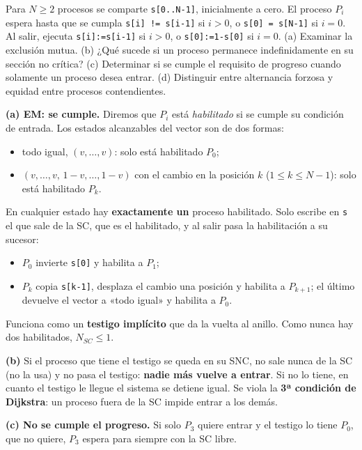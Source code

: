 \begin{ejercicio}
Para $N \ge 2$ procesos se comparte \texttt{s[0..N-1]}, inicialmente a cero. El proceso $P_i$ espera hasta que se
cumpla \texttt{s[i] != s[i-1]} si $i > 0$, o \texttt{s[0] = s[N-1]} si $i = 0$. Al salir, ejecuta
\texttt{s[i]:=s[i-1]} si $i > 0$, o \texttt{s[0]:=1-s[0]} si $i = 0$. (a) Examinar la exclusión mutua. (b) ¿Qué
sucede si un proceso permanece indefinidamente en su sección no crítica? (c) Determinar si se cumple el
requisito de progreso cuando solamente un proceso desea entrar. (d) Distinguir entre alternancia forzosa y
equidad entre procesos contendientes.
\end{ejercicio}
\begin{solucion}
\textbf{(a) EM: se cumple.} Diremos que $P_i$ está \emph{habilitado} si se cumple su condición de entrada. Los
estados alcanzables del vector son de dos formas:
\begin{itemize}[leftmargin=*,noitemsep]
  \item todo igual, $(v,\dots,v)$: solo está habilitado $P_0$;
  \item $(v,\dots,v,\,1-v,\dots,1-v)$ con el cambio en la posición $k$ ($1 \le k \le N-1$): solo está habilitado
        $P_k$.
\end{itemize}
En cualquier estado hay \textbf{exactamente un} proceso habilitado. Solo escribe en \texttt{s} el que sale de la
SC, que es el habilitado, y al salir pasa la habilitación a su sucesor:
\begin{itemize}[leftmargin=*,noitemsep]
  \item $P_0$ invierte \texttt{s[0]} y habilita a $P_1$;
  \item $P_k$ copia \texttt{s[k-1]}, desplaza el cambio una posición y habilita a $P_{k+1}$; el último devuelve el
        vector a «todo igual» y habilita a $P_0$.
\end{itemize}
Funciona como un \textbf{testigo implícito} que da la vuelta al anillo. Como nunca hay dos habilitados,
$N_{SC} \le 1$.

\textbf{(b)} Si el proceso que tiene el testigo se queda en su SNC, no sale nunca de la SC (no la usa) y no pasa el
testigo: \textbf{nadie más vuelve a entrar}. Si no lo tiene, en cuanto el testigo le llegue el sistema se detiene
igual. Se viola la \textbf{3ª condición de Dijkstra}: un proceso fuera de la SC impide entrar a los demás.

\textbf{(c) No se cumple el progreso.} Si solo $P_3$ quiere entrar y el testigo lo tiene $P_0$, que no quiere, $P_3$
espera para siempre con la SC libre.


\end{solucion}
